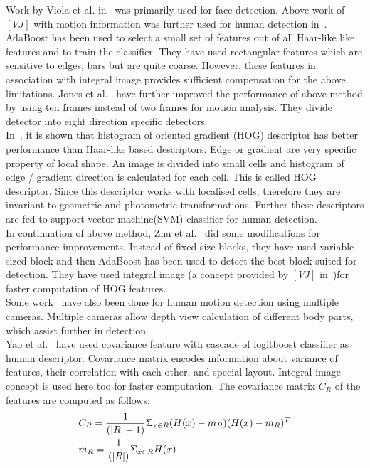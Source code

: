 \indent Work by Viola et al. in~\cite{17} was primarily used for
face detection.  Above work of $[VJ]$ with motion information was further
used for human detection in~\cite{16}.  AdaBoost has been used to
select a small set of features out of all Haar-like like features and to
train the classifier. They have used rectangular features which are
sensitive to edges, bars but are quite coarse. However, these features
in association with integral image provides sufficient compensation for
the above limitations. Jones et al.~\cite{26} have further improved
the performance of above method by using ten frames instead of two frames
for motion analysis. They divide detector into eight direction specific
detectors.\\
\indent In~\cite{20, 21}, it is shown that histogram of oriented
gradient (HOG) descriptor has better performance than Haar-like based
descriptors. Edge or gradient are very specific property of local shape.
An image is divided into small cells and histogram of edge / gradient
direction is calculated for each cell. This is called HOG descriptor.
Since this descriptor works with localised cells, therefore they are
invariant to geometric and photometric transformations. Further these
descriptors are fed to support vector machine(SVM) classifier for human
detection.\\
\indent In continuation of above method, Zhu et al.~\cite{20} did some
modifications for performance improvements. Instead of fixed size
blocks, they have used variable sized block and then AdaBoost has been
used to detect the best block suited for detection. They have used
integral image (a concept provided by $[VJ]$ in~\cite{17})for faster
computation of HOG features.\\
\indent Some work~\cite{30} have also been done for human motion
detection using multiple cameras. Multiple cameras allow depth view
calculation of different body parts, which assist further in
detection.\\
\indent Yao et al.~\cite{25} have used covariance feature with cascade
of logitboost classifier as human descriptor. Covariance matrix encodes
information about variance of features, their correlation with each
other, and special layout. Integral image concept is used here too for
faster computation. The covariance matrix $C_R$ of the features are
computed as follows:
\begin{equation}
\begin{aligned}
& C_R = {1 \over {(|R| - 1)}} \Sigma _{x \in R} (H(x) - m_R) (H(x) - m_R)^T\\
& m_R = {1 \over {(|R|)}} \Sigma _{x \in R} H(x)
\end{aligned}
\end{equation}
